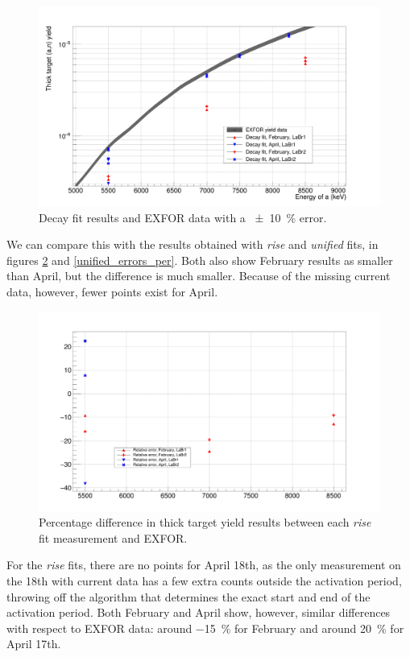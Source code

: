 \documentclass[a4paper,12pt]{report}
\begin{document}
\begin{figure}[H]
	\centering
	\includegraphics[width=\textwidth]{reactions_v_energy_decay.png}
	\caption{Decay fit results and EXFOR data with a \qty{\pm 10}{\percent} error.}
	\label{reactions_v_energy_decay}
\end{figure}

We can compare this with the results obtained with \textit{rise} and \textit{unified} fits, in figures \ref{rise_errors_per} and \ref{unified_errors_per}.
Both also show February results as smaller than April, but the difference is much smaller.
Because of the missing current data, however, fewer points exist for April.

\begin{figure}[H]
	\centering
	\includegraphics[width=\textwidth]{rise_errors_per.png}
	\caption{Percentage difference in thick target yield results between each \textit{rise} fit measurement and EXFOR.}
	\label{rise_errors_per}
\end{figure}

For the \textit{rise} fits, there are no points for April 18th, as the only measurement on the 18th with current data has a few extra counts outside the activation period, throwing off the algorithm that determines the exact start and end of the activation period.
Both February and April show, however, similar differences with respect to EXFOR data: around \qty{-15}{\percent} for February and around \qty{+20}{\percent} for April 17th.
\end{document}
